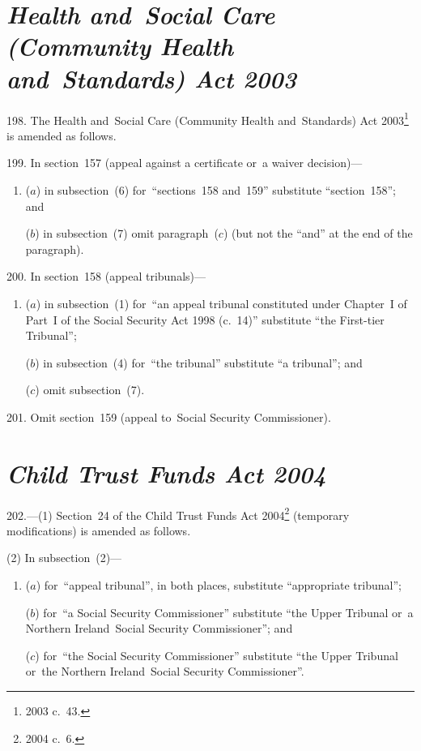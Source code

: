 \documentclass[12pt,a4paper]{article}
\begin{document}
\section*{\itshape Health and~Social Care (Community Health and~Standards) Act 2003}

198.  The Health and~Social Care (Community Health and~Standards) Act 2003\footnote{2003 c.~43.} is amended as follows.

\medskip

199.  In section~157 (appeal against a certificate or~a waiver decision)—
\begin{enumerate}\item[]
($a$) in subsection~(6) for~“sections~158 and~159” substitute “section~158”; and

($b$) in subsection~(7) omit paragraph~($c$)  (but not the “and” at the end of the paragraph).
\end{enumerate}

\medskip

200.  In section~158 (appeal tribunals)—
\begin{enumerate}\item[]
($a$) in subsection~(1) for~“an appeal tribunal constituted under Chapter~I of Part~I of the Social Security Act 1998 (c.~14)” substitute “the First-tier Tribunal”;

($b$) in subsection~(4) for~“the tribunal” substitute “a tribunal”; and

($c$) omit subsection~(7).
\end{enumerate}

\medskip

201.  Omit section~159 (appeal to~Social Security Commissioner).

\section*{\itshape Child Trust Funds Act 2004}

202.---(1)  Section~24 of the Child Trust Funds Act 2004\footnote{2004 c.~6.} (temporary modifications) is amended as follows.

(2) In subsection~(2)—
\begin{enumerate}\item[]
($a$) for~“appeal tribunal”, in both places, substitute “appropriate tribunal”;

($b$) for~“a Social Security Commissioner” substitute “the Upper Tribunal or~a Northern Ireland~Social Security Commissioner”; and

($c$) for~“the Social Security Commissioner” substitute “the Upper Tribunal or~the Northern Ireland~Social Security Commissioner”.
\end{enumerate}
\end{document}

